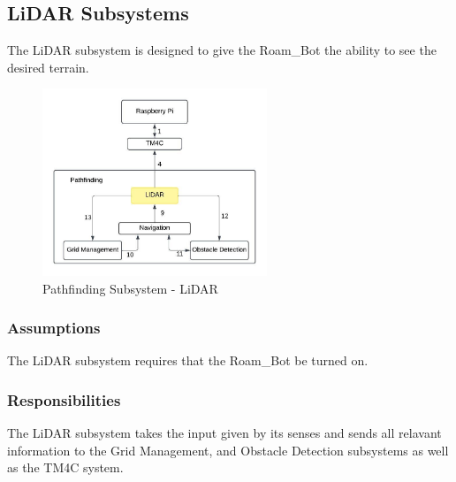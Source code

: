 \subsection{LiDAR Subsystems}
The LiDAR subsystem is designed to give the Roam\_Bot the ability to see the desired terrain.
\begin{figure}[h!]
	\centering
 	\includegraphics[width=0.60\textwidth]{images/pathfinding_images/LiDAR.jpeg}
 \caption{Pathfinding Subsystem - LiDAR} %
\end{figure}

\subsubsection{Assumptions}

The LiDAR subsystem requires that the Roam\_Bot be turned on.
\subsubsection{Responsibilities}

The LiDAR subsystem takes the input given by its senses and sends all relavant information to the Grid Management, and Obstacle Detection subsystems as well as the TM4C system.

